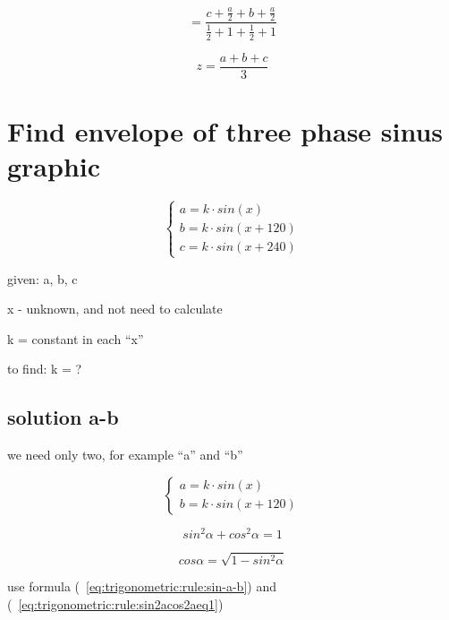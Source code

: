 \documentclass[unicode, 12pt, a4paper]{article}
\begin{document}
\begin{equation}
  = \frac{c + \frac{a}{2} + b + \frac{a}{2}}{\frac{1}{2} + 1 + \frac{1}{2} + 1}
\end{equation}


\begin{equation}
  z = \frac{a + b + c}{3}
\end{equation}


\section{Find envelope of three phase sinus graphic}

\begin{equation}
  \label{eq:envelope:three-phase-case}
  \begin{cases}
    a = k \cdot sin(x)\\
    b = k \cdot sin(x + 120)\\
    c = k \cdot sin(x + 240)
  \end{cases}
\end{equation}

given: a, b, c

x - unknown, and not need to calculate

k = constant in each ``x''

to find: k = ?


\subsection{solution a-b}

we need only two, for example ``a'' and ``b''

\begin{equation}
  \label{eq:envelope:phase-a-b}
  \begin{cases}
    a = k \cdot sin(x)\\
    b = k \cdot sin(x + 120)
  \end{cases}
\end{equation}


\begin{equation}
  sin^2 \alpha + cos^2 \alpha = 1
\end{equation}

\begin{equation}
  \label{eq:trigonometric:rule:sin2acos2aeq1}
  cos \alpha = \sqrt{1 - sin^2 \alpha}
\end{equation}


use formula (~\ref{eq:trigonometric:rule:sin-a-b}) and (~\ref{eq:trigonometric:rule:sin2acos2aeq1})
\end{document}
